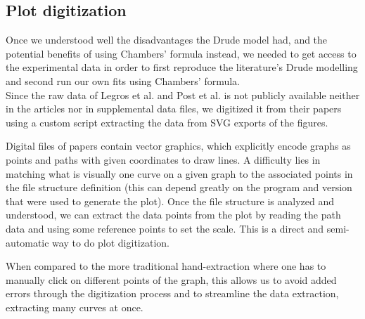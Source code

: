 \subsection{Plot digitization}
Once we understood well the disadvantages the Drude model had, 
and the potential benefits of using Chambers' formula instead, 
we needed to get access to the experimental data in order to 
first reproduce the literature's Drude modelling and 
second run our own fits using Chambers' formula.\\

Since the raw data of Legros et al. and Post et al. is not publicly available neither in the articles nor in supplemental data files, 
we digitized it from their papers using a custom script extracting the data from SVG exports of the figures. 

Digital files of papers contain vector graphics, 
which explicitly encode graphs as points and paths with given coordinates to draw lines. 
A difficulty lies in matching what is visually one curve on a given graph to the associated points in the file structure definition 
(this can depend greatly on the program and version that were used to generate the plot). 
Once the file structure is analyzed and understood, 
we can extract the data points from the plot by reading the path data and using some reference points to set the scale.
This is a direct and semi-automatic way to do plot digitization.
 
When compared to the more traditional hand-extraction where one has to manually click on different points of the graph, 
this allows us to avoid added errors through the digitization process 
and to streamline the data extraction, extracting many curves at once.
